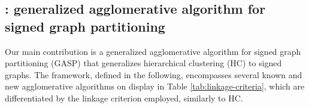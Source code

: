 


\subsection{\algname{}: generalized agglomerative algorithm for signed graph partitioning} \label{sec:algorithm} 

Our main contribution is a generalized agglomerative algorithm for signed graph partitioning (GASP) that generalizes hierarchical clustering (HC) to signed graphs. 
The framework, defined in the following, encompasses several known and new agglomerative algorithms on display in Table \ref{tab:linkage-criteria}, which are differentiated by the linkage criterion employed, similarly to HC.

